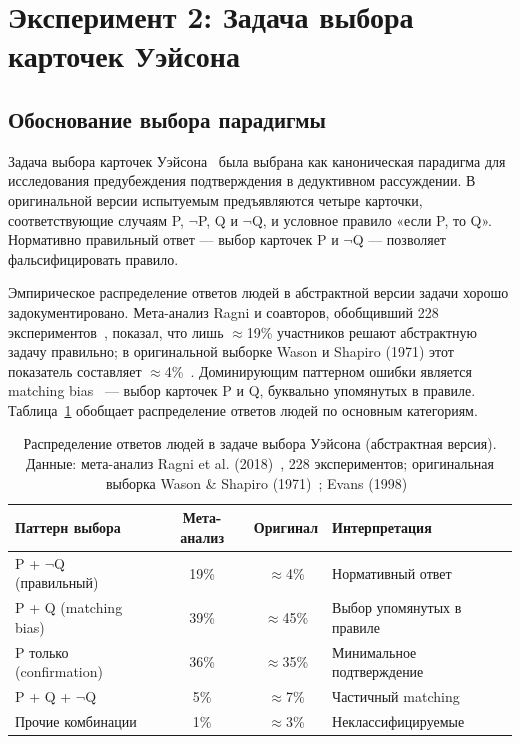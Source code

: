 \section{Эксперимент 2: Задача выбора карточек Уэйсона}

\subsection{Обоснование выбора парадигмы}

Задача выбора карточек Уэйсона~\cite{wason1966reasoning} была выбрана как каноническая парадигма для исследования предубеждения подтверждения в дедуктивном рассуждении. В оригинальной версии испытуемым предъявляются четыре карточки, соответствующие случаям P, $\lnot$P, Q и $\lnot$Q, и условное правило «если P, то Q». Нормативно правильный ответ --- выбор карточек P и $\lnot$Q --- позволяет фальсифицировать правило.

Эмпирическое распределение ответов людей в абстрактной версии задачи хорошо задокументировано. Мета-анализ Ragni и соавторов, обобщивший 228 экспериментов~\cite{ragni2018experimental}, показал, что лишь $\approx$19\% участников решают абстрактную задачу правильно; в оригинальной выборке Wason и Shapiro (1971) этот показатель составляет $\approx$4\%~\cite{wason1971natural}. Доминирующим паттерном ошибки является matching bias~\cite{evans1998matching} --- выбор карточек P и Q, буквально упомянутых в правиле. Таблица~\ref{tab:human_wason} обобщает распределение ответов людей по основным категориям.

\begin{table}[h!]
\caption{Распределение ответов людей в задаче выбора Уэйсона (абстрактная версия). Данные: мета-анализ Ragni et al. (2018)~\cite{ragni2018experimental}, 228 экспериментов; оригинальная выборка Wason \& Shapiro (1971)~\cite{wason1971natural}; Evans (1998)~\cite{evans1998matching}}
\label{tab:human_wason}
\centering
\begin{tabular}{|l|c|c|l|}
\hline
\textbf{Паттерн выбора} & \textbf{Мета-анализ} & \textbf{Оригинал} & \textbf{Интерпретация} \\
\hline
P + $\lnot$Q (правильный) & 19\% & $\approx$4\% & Нормативный ответ \\
P + Q (matching bias) & 39\% & $\approx$45\% & Выбор упомянутых в правиле \\
P только (confirmation) & 36\% & $\approx$35\% & Минимальное подтверждение \\
P + Q + $\lnot$Q & 5\% & $\approx$7\% & Частичный matching \\
Прочие комбинации & 1\% & $\approx$3\% & Неклассифицируемые \\
\hline
\end{tabular}
\end{table}

